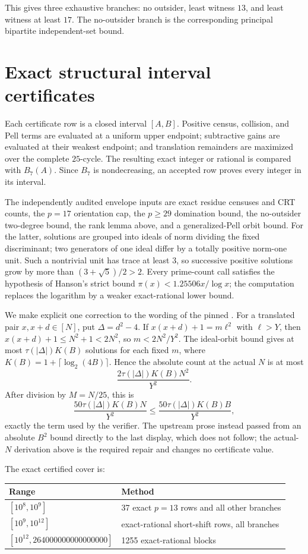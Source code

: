 \documentclass[11pt]{article}
\newcommand{\Bseven}{B_7}
\begin{document}
This gives three exhaustive branches: no outsider, least witness $13$, and
least witness at least $17$.  The no-outsider branch is the corresponding
principal bipartite independent-set bound.

\section{Exact structural interval certificates}

Each certificate row is a closed interval $[A,B]$.  Positive census,
collision, and Pell terms are evaluated at a uniform upper endpoint;
subtractive gains are evaluated at their weakest endpoint; and translation
remainders are maximized over the complete $25$-cycle.  The resulting exact
integer or rational is compared with $\Bseven(A)$.  Since $\Bseven$ is
nondecreasing, an accepted row proves every integer in its interval.

The independently audited envelope inputs are exact residue censuses and CRT
counts, the $p=17$ orientation cap, the $p\ge29$ domination bound, the
no-outsider two-degree bound, the rank lemma above, and a generalized-Pell
orbit bound.  For the latter, solutions are grouped into ideals of norm
dividing the fixed discriminant; two generators of one ideal differ by a
totally positive norm-one unit.  Such a nontrivial unit has trace at least
$3$, so successive positive solutions grow by more than
$(3+\sqrt5)/2>2$.  Every prime-count call satisfies the hypothesis of
Hanson's strict bound $\pi(x)<1.25506x/\log x$; the computation replaces
the logarithm by a weaker exact-rational lower bound.

We make explicit one correction to the wording of the pinned
.  For a translated pair $x,x+d\in[N]$, put
$\Delta=d^2-4$.  If $x(x+d)+1=m\ell^2$ with $\ell>Y$, then
$x(x+d)+1\le N^2+1<2N^2$, so $m<2N^2/Y^2$.  The ideal-orbit bound gives at
most $\tau(|\Delta|)K(B)$ solutions for each fixed $m$, where
$K(B)=1+\lceil\log_2(4B)\rceil$.  Hence the absolute count at the actual
$N$ is at most
\[
 \frac{2\tau(|\Delta|)K(B)N^2}{Y^2}.
\]
After division by $M=N/25$, this is
\[
 \frac{50\tau(|\Delta|)K(B)N}{Y^2}
 \le \frac{50\tau(|\Delta|)K(B)B}{Y^2},
\]
exactly the term used by the verifier.  The upstream prose instead passed
from an absolute $B^2$ bound directly to the last display, which does not
follow; the actual-$N$ derivation above is the required repair and changes no
certificate value.

The exact certified cover is:
\begin{center}
\begin{tabular}{@{}ll@{}}
\toprule
Range & Method \\
\midrule
$[10^8,10^9]$ & 37 exact $p=13$ rows and all other branches \\
$[10^9,10^{12}]$ & exact-rational short-shift rows, all branches \\
$[10^{12},264000000000000000]$ & 1255 exact-rational blocks \\
\bottomrule
\end{tabular}
\end{center}
\end{document}
